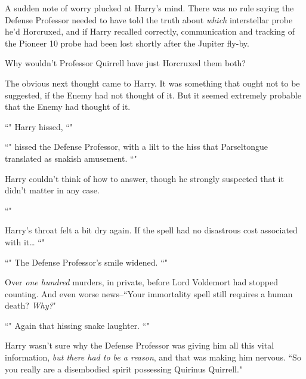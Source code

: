 A sudden note of worry plucked at Harry's mind. There was no rule saying the Defense Professor needed to have told the truth about \emph{which} interstellar probe he'd Horcruxed, and if Harry recalled correctly, communication and tracking of the Pioneer 10 probe had been lost shortly after the Jupiter fly-by.

Why wouldn't Professor Quirrell have just Horcruxed them both?

The obvious next thought came to Harry. It was something that ought not to be suggested, if the Enemy had not thought of it. But it seemed extremely probable that the Enemy had thought of it.

``" Harry hissed, ``"

``" hissed the Defense Professor, with a lilt to the hiss that Parseltongue translated as snakish amusement. ``"

Harry couldn't think of how to answer, though he strongly suspected that it didn't matter in any case.

``"

Harry's throat felt a bit dry again. If the spell had no disastrous cost associated with it{\ldots} ``"

``" The Defense Professor's smile widened. ``"

Over \emph{one hundred} murders, in private, before Lord Voldemort had stopped counting. And even worse news\---``Your immortality spell still requires a human death? \emph{Why?}"

``" Again that hissing snake laughter. ``"

Harry wasn't sure why the Defense Professor was giving him all this vital information, \emph{but there had to be a reason}, and that was making him nervous. ``So you really are a disembodied spirit possessing Quirinus Quirrell."


